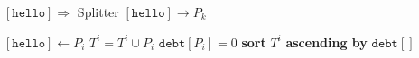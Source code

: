 \documentclass{article}
\begin{document}
\pagestyle{empty}

\newcommand{\send}{\Rightarrow}
\newcommand{\sendto}{\rightarrow}
\algrenewcommand{}
\algrenewcommand\textproc{\textrm}

\begin{algorithmic}
  \State $[\mathtt{hello}] \send$ Splitter
  \State $[\mathtt{hello}]\sendto P_k$
  \EndFor
  \EndProcedure
\end{algorithmic}
\begin{algorithmic}
  \State $[\mathtt{hello}] \gets P_i$
  \State $T^i = T^i \cup P_i$
  \State $\mathtt{debt}[P_i]=0$
  \State \textbf{sort} $T^i$ \textbf{ascending by} $\mathtt{debt[]}$
  \EndWhile
  \EndProcedure
  
\end{algorithmic}
\end{document}
